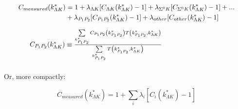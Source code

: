 \documentclass[../AnalysisNoteJBuxton.tex]{subfiles}
\begin{document}
\begin{equation}
\begin{array}{l}
\vspace{4mm}
\begin{split}
 C_{measured}(k^{*}_{\Lambda K}) & = 1 + \lambda_{\Lambda K}[C_{\Lambda K}(k^{*}_{\Lambda K})-1] + \lambda_{\Sigma^{0}K}[C_{\Sigma^{0}K}(k^{*}_{\Lambda K})-1] + ... \\ &
 + \lambda_{P_{1}P_{2}}[C_{P_{1}P_{2}}(k^{*}_{\Lambda K})-1] + \lambda_{other}[C_{other}(k^{*}_{\Lambda K})-1] 
\end{split}
\\
\vspace{2mm}
  ~~~~~C_{P_{1}P_{2}}(k^{*}_{\Lambda K}) \equiv \frac{\sum\limits_{k^{*}_{P_{1}P_{2}}} C_{P_{1}P_{2}}\left(k^{*}_{P_{1}P_{2}}\right) T\left(k^{*}_{P_{1}P_{2}},k^{*}_{\Lambda K}\right)}{\sum\limits_{k^{*}_{P_{1}P_{2}}} T\left(k^{*}_{P_{1}P_{2}},k^{*}_{\Lambda K}\right)}
\end{array} 
\label{eqn:ResidualsFull}
\end{equation}

  Or, more compactly:

\begin{equation}
 C_{measured}(k^{*}_{\Lambda K}) = 1 + \sum\limits_{i}  \lambda_{i}[C_{i}(k^{*}_{\Lambda K})-1]
\label{eqn:Residuals}
\end{equation}
\end{document}
